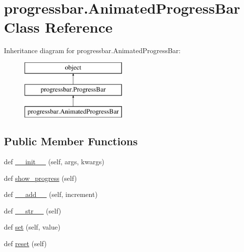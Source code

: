 \hypertarget{classprogressbar_1_1AnimatedProgressBar}{}\section{progressbar.\+Animated\+Progress\+Bar Class Reference}
\label{classprogressbar_1_1AnimatedProgressBar}
Inheritance diagram for progressbar.\+Animated\+Progress\+Bar\+:\begin{figure}[H]
\begin{center}
\leavevmode
\includegraphics[height=3.000000cm]{classprogressbar_1_1AnimatedProgressBar}
\end{center}
\end{figure}
\subsection*{Public Member Functions}
\begin{DoxyCompactItemize}
\item 
def \hyperlink{classprogressbar_1_1AnimatedProgressBar_ac5fb173f8610ea6caa27306a60a8903f}{\+\_\+\+\_\+init\+\_\+\+\_\+} (self, args, kwargs)
\item 
def \hyperlink{classprogressbar_1_1AnimatedProgressBar_a87d45550598b83128ee14b4d7acdea27}{show\+\_\+progress} (self)
\item 
def \hyperlink{classprogressbar_1_1ProgressBar_ab72aa084f53baad02409c8e7e5979046}{\+\_\+\+\_\+add\+\_\+\+\_\+} (self, increment)
\item 
def \hyperlink{classprogressbar_1_1ProgressBar_aea02b9e37516e9d267e2d48b4e415bd8}{\+\_\+\+\_\+str\+\_\+\+\_\+} (self)
\item 
def \hyperlink{classprogressbar_1_1ProgressBar_a0794442f190ed0d6e5b894f29881758b}{set} (self, value)
\item 
def \hyperlink{classprogressbar_1_1ProgressBar_aefc445915e4d1eb0bbf962857c122dac}{reset} (self)
\end{DoxyCompactItemize}
